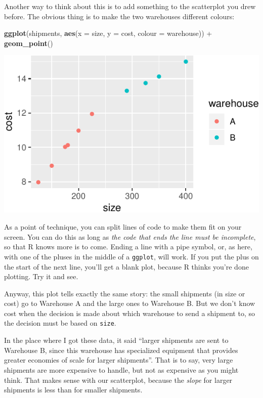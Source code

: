 \documentclass[]{tufte-book}
\newenvironment{Shaded}{}{}
\newcommand{\DataTypeTok}[1]{\textcolor[rgb]{0.56,0.13,0.00}{#1}}
\newcommand{\KeywordTok}[1]{\textcolor[rgb]{0.00,0.44,0.13}{\textbf{#1}}}
\newcommand{\NormalTok}[1]{#1}
\newcommand{\OperatorTok}[1]{\textcolor[rgb]{0.40,0.40,0.40}{#1}}
\newcommand{\StringTok}[1]{\textcolor[rgb]{0.25,0.44,0.63}{#1}}
\theoremstyle{definition}
\theoremstyle{definition}
\theoremstyle{definition}
\theoremstyle{remark}
\begin{document}
Another way to think about this is to add something to the scatterplot
you drew before. The obvious thing is to make the two warehouses
different colours:

\begin{Shaded}
\begin{Highlighting}[]
\KeywordTok{ggplot}\NormalTok{(shipments, }\KeywordTok{aes}\NormalTok{(}\DataTypeTok{x =}\NormalTok{ size, }\DataTypeTok{y =}\NormalTok{ cost, }\DataTypeTok{colour =}\NormalTok{ warehouse)) }\OperatorTok{+}\StringTok{ }
\StringTok{    }\KeywordTok{geom_point}\NormalTok{()}
\end{Highlighting}
\end{Shaded}

\includegraphics{02-reading-in_files/figure-latex/unnamed-chunk-25-1}

As a point of technique, you can split lines of code to make them fit on
your screen. You can do this as long as \emph{the code that ends
the line must be incomplete}, so that R knows more is to come. Ending a
line with a pipe symbol, or, as here, with one of the pluses in the
middle of a \texttt{ggplot}, will work. If you put the plus on the start
of the next line, you'll get a blank plot, because R thinks you're done
plotting. Try it and see.

Anyway, this plot tells exactly the same story: the small shipments (in
size or cost) go to Warehouse A and the large ones to Warehouse B. But
we don't know cost when the decision is made about which warehouse to
send a shipment to, so the decision must be based on \texttt{size}.

In the place where I got these data, it said ``larger shipments are sent
to Warehouse B, since this warehouse has specialized equipment that
provides greater economies of scale for larger shipments''. That is to
say, very large shipments are more expensive to handle, but not as
expensive as you might think.
That makes sense with our scatterplot, because the \emph{slope} for
larger shipments is less than for smaller shipments.
\end{document}
